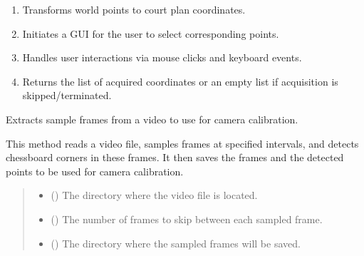 \documentclass[letterpaper,10pt,english]{sphinxmanual}
\begin{document}
\begin{fulllineitems}
\begin{fulllineitems}
\begin{enumerate}
\item {} 
\sphinxAtStartPar
Transforms world points to court plan coordinates.

\item {} 
\sphinxAtStartPar
Initiates a GUI for the user to select corresponding points.

\item {} 
\sphinxAtStartPar
Handles user interactions via mouse clicks and keyboard events.

\item {} 
\sphinxAtStartPar
Returns the list of acquired coordinates or an empty list if acquisition is skipped/terminated.

\end{enumerate}

\end{fulllineitems}


\begin{fulllineitems}
\label{\detokenize{CameraUtils:id13}}
\pysigstartsignatures
{}
\pysigstopsignatures
\sphinxAtStartPar
Extracts sample frames from a video to use for camera calibration.

\sphinxAtStartPar
This method reads a video file, samples frames at specified intervals,
and detects chessboard corners in these frames. It then saves the frames
and the detected points to be used for camera calibration.
\begin{quote}\begin{description}
\begin{itemize}
\item {} 
\sphinxAtStartPar
{} () \textendash{} The directory where the video file is located.

\item {} 
\sphinxAtStartPar
{} () \textendash{} The number of frames to skip between each sampled frame.

\item {} 
\sphinxAtStartPar
{} () \textendash{} The directory where the sampled frames will be saved.


\end{itemize}
\end{description}
\end{quote}
\end{fulllineitems}
\end{fulllineitems}
\end{document}
